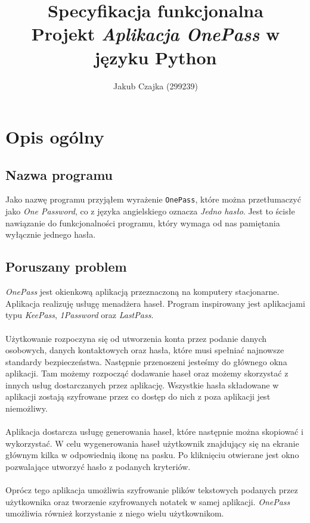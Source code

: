 \documentclass[a4paper]{article}
\title{Specyfikacja funkcjonalna \\ Projekt \textit{Aplikacja OnePass} w języku Python}
\author{Jakub Czajka (299239)}
\newcommand{\prog}{\texttt}
\begin{document}
\maketitle
\thispagestyle{empty}
\tableofcontents

\newpage

\section{Opis ogólny}

\subsection{Nazwa programu}
Jako nazwę programu przyjąłem wyrażenie \prog{OnePass}, które można przetłumaczyć jako \textit{One Password}, co z języka angielskiego oznacza \textit{Jedno hasło}. Jest to ścisłe nawiązanie do funkcjonalności programu, który wymaga od nas pamiętania wyłącznie jednego hasła.

\subsection{Poruszany problem}
\textit{OnePass} jest okienkową aplikacją przeznaczoną na komputery stacjonarne. Aplikacja realizuję usługę menadżera haseł. Program inspirowany jest aplikacjami typu \textit{KeePass}, \textit{1Password} oraz \textit{LastPass}.\\ \\
Użytkowanie rozpoczyna się od utworzenia konta przez podanie danych osobowych, danych kontaktowych oraz hasła, które musi spełniać najnowsze standardy bezpieczeństwa. Następnie przenoszeni jesteśmy do głównego okna aplikacji. Tam możemy rozpocząć dodawanie haseł oraz możemy skorzystać z innych usług dostarczanych przez aplikację. Wszystkie hasła składowane w aplikacji zostają szyfrowane przez co dostęp do nich z poza aplikacji jest niemożliwy. \\ \\
Aplikacja dostarcza usługę generowania haseł, które następnie można skopiować i wykorzystać. W celu wygenerowania haseł użytkownik znajdujący się na ekranie głównym kilka w odpowiednią ikonę na pasku. Po kliknięciu otwierane jest okno pozwalające utworzyć hasło z podanych kryteriów. \\ \\
Oprócz tego aplikacja umożliwia szyfrowanie plików tekstowych podanych przez użytkownika oraz tworzenie szyfrowanych notatek w samej aplikacji. \textit{OnePass} umożliwia również korzystanie z niego wielu użytkownikom.
\end{document}
